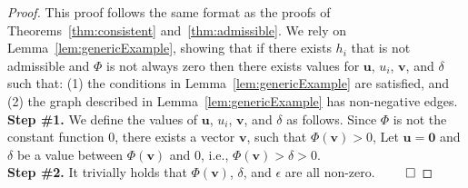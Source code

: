 \documentclass[smallextended]{svjour3}       %
\newcommand{\kastarphi}{\textup{kA}$^*_{\Phi}$\xspace}
\newcommand{\axiomadm}{admissible\xspace}
\newcommand{\vect}[1]{\mathbf{#1}}
\begin{document}

\arbitrary*
\begin{proof}
This proof follows the same format as the proofs of Theorems~\ref{thm:consistent} and~\ref{thm:admissible}.
We rely on Lemma~\ref{lem:genericExample}, showing that if there exists $h_i$ that is not admissible and $\Phi$ is not always zero then there exists values for $\vect{u}$, $u_i$, $\vect{v}$, and $\delta$ such that: (1) the conditions in Lemma~\ref{lem:genericExample} are satisfied, and (2) the graph described in Lemma~\ref{lem:genericExample} has non-negative edges. \\
  \noindent \textbf{Step \#1.} We define the values of $\vect{u}$, $u_i$, $\vect{v}$, and $\delta$ as follows. 
  Since $\Phi$ is not the constant function 0, there exists a vector $\vect{v}$, such that $\Phi(\vect{v}) > 0$, Let $\vect{u} = \vect{0}$ and $\delta$ be a value between $\Phi(\vect{v})$ and $0$, i.e., $\Phi(\vect{v}) > \delta > 0$.\\ 
  \noindent \textbf{Step \#2.} It trivially holds that $\Phi(\vect{v})$, $\delta$, and $\epsilon$ are all non-zero.  $\qed$
\end{proof}
\end{document}
